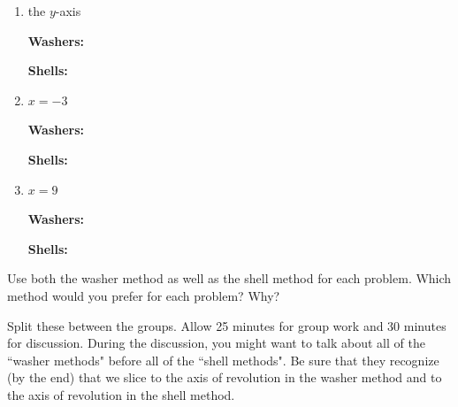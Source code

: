 \documentclass[]{ximera}
\begin{document}
\begin{problem}
\begin{enumerate}
		
		
		\item  the $y$-axis
		\begin{freeResponse}
		{\bf Washers: }
		
		{\bf Shells: }
		\end{freeResponse}
		
		
		
		\item  $x=-3$
		\begin{freeResponse}
		{\bf Washers: }
		
		{\bf Shells: }
		\end{freeResponse}
		
		
		
		\item$x=9$
		\begin{freeResponse}
		{\bf Washers: }
		
		{\bf Shells: }
		\end{freeResponse}
		
	\end{enumerate}
	
Use both the washer method as well as the shell method for each problem.  
Which method would you prefer for each problem?  Why?
	
\end{problem}

\begin{instructorNotes}
Split these between the groups.  
Allow 25 minutes for group work and 30 minutes for discussion.  
During the discussion, you might want to talk about all of the ``washer methods" before all of the ``shell methods".  
Be sure that they recognize (by the end) that we slice  to the axis of revolution in the washer method and  to the axis of revolution in the shell method.
\end{instructorNotes}
\end{document}
